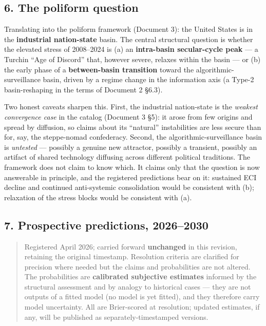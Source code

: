 \documentclass[
]{article}
\begin{document}
\subsection{6. The poliform question}\label{the-poliform-question}

Translating into the poliform framework (Document 3): the United States
is in the \textbf{industrial nation-state} basin. The central structural
question is whether the elevated stress of 2008--2024 is (a) an
\textbf{intra-basin secular-cycle peak} --- a Turchin ``Age of Discord''
that, however severe, relaxes within the basin --- or (b) the early
phase of a \textbf{between-basin transition} toward the
algorithmic-surveillance basin, driven by a regime change in the
information axis (a Type-2 basin-reshaping in the terms of Document 2
§6.3).

Two honest caveats sharpen this. First, the industrial nation-state is
the \emph{weakest convergence case} in the catalog (Document 3 §5): it
arose from few origins and spread by diffusion, so claims about its
``natural'' instabilities are less secure than for, say, the
steppe-nomad confederacy. Second, the algorithmic-surveillance basin is
\emph{untested} --- possibly a genuine new attractor, possibly a
transient, possibly an artifact of shared technology diffusing across
different political traditions. The framework does not claim to know
which. It claims only that the question is now answerable in principle,
and the registered predictions bear on it: sustained ECI decline and
continued anti-systemic consolidation would be consistent with (b);
relaxation of the stress blocks would be consistent with (a).

\subsection{7. Prospective predictions,
2026--2030}\label{prospective-predictions-20262030}

\begin{quote}
Registered April 2026; carried forward \textbf{unchanged} in this
revision, retaining the original timestamp. Resolution criteria are
clarified for precision where needed but the claims and probabilities
are not altered. The probabilities are \textbf{calibrated subjective
estimates} informed by the structural assessment and by analogy to
historical cases --- they are not outputs of a fitted model (no model is
yet fitted), and they therefore carry model uncertainty. All are
Brier-scored at resolution; updated estimates, if any, will be published
as separately-timestamped versions.
\end{quote}
\end{document}
